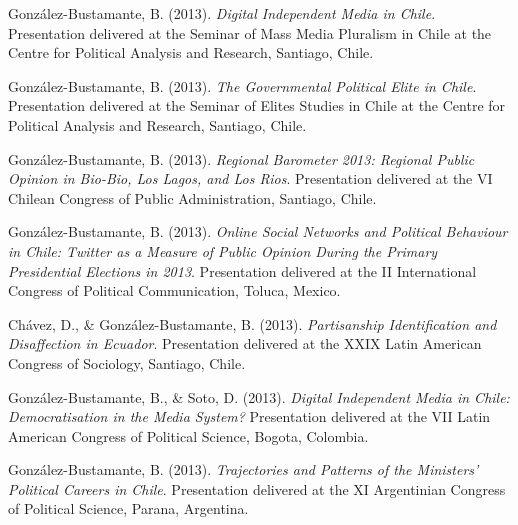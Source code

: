 \begin{publications}
\begin{benumerate}{71}
\item{\small González-Bustamante, B. (2013). {\itshape Digital Independent Media in Chile}. Presentation delivered at the Seminar of Mass Media Pluralism in Chile at the Centre for Political Analysis and Research, Santiago, Chile.}\vspace{1mm}

\item{\small González-Bustamante, B. (2013). {\itshape The Governmental Political Elite in Chile}. Presentation delivered at the Seminar of Elites Studies in Chile at the Centre for Political Analysis and Research, Santiago, Chile.}\vspace{1mm}

\item{\small González-Bustamante, B. (2013). {\itshape Regional Barometer 2013: Regional Public Opinion in Bio-Bio, Los Lagos, and Los Rios}. Presentation delivered at the VI Chilean Congress of Public Administration, Santiago, Chile.}\vspace{1mm}

\item{\small González-Bustamante, B. (2013). {\itshape Online Social Networks and Political Behaviour in Chile: Twitter as a Measure of Public Opinion During the Primary Presidential Elections in 2013}. Presentation delivered at the II International Congress of Political Communication, Toluca, Mexico.}\vspace{1mm}

\item{\small Chávez, D., \& González-Bustamante, B. (2013). {\itshape Partisanship Identification and Disaffection in Ecuador}. Presentation delivered at the XXIX Latin American Congress of Sociology, Santiago, Chile.}\vspace{1mm}

\item{\small González-Bustamante, B., \& Soto, D. (2013). {\itshape Digital Independent Media in Chile: Democratisation in the Media System?} Presentation delivered at the VII Latin American Congress of Political Science, Bogota, Colombia.}\vspace{1mm}

\item{\small González-Bustamante, B. (2013). {\itshape Trajectories and Patterns of the Ministers' Political Careers in Chile}. Presentation delivered at the XI Argentinian Congress of Political Science, Parana, Argentina.}\vspace{1mm}


\end{benumerate}
\end{publications}
